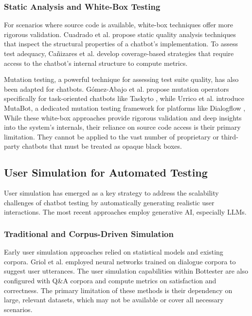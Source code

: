 \subsubsection{Static Analysis and White-Box Testing}

For scenarios where source code is available,
white-box techniques offer more rigorous validation.
Cuadrado et al. \autocite{cuadradoIntegratingStaticQuality2024}
propose static quality analysis techniques
that inspect the structural properties of a chatbot's implementation.
To assess test adequacy, Cañizares et al.
\autocite{canizaresCoveragebasedStrategiesAutomated2024}
develop coverage-based strategies that
require access to the chatbot's internal structure to compute metrics.

Mutation testing, a powerful technique for assessing test suite quality,
has also been adapted for chatbots.
Gómez-Abajo et al. \autocite{gomez-abajoMutationTestingTaskOriented2024}
propose mutation operators specifically for task-oriented chatbots like Taskyto \autocite{sanchezcuadradoAutomatingDevelopmentTaskoriented2024},
while Urrico et al. \autocite{urricoMutaBotMutationTesting2024} introduce MutaBot,
a dedicated mutation testing framework for platforms like Dialogflow \autocite{Dialogflow},
While these white-box approaches provide rigorous validation
and deep insights into the system's internals,
their reliance on source code access
is their primary limitation.
They cannot be applied to the vast number of
proprietary or third-party chatbots
that must be treated as opaque black boxes.

\subsection{User Simulation for Automated Testing}

User simulation has emerged as a key strategy to
address the scalability challenges of chatbot testing
by automatically generating realistic user interactions.
The most recent approaches employ generative \acl{AI},
especially \acp {LLM}.

\subsubsection{Traditional and Corpus-Driven Simulation}

Early user simulation approaches
relied on statistical models and existing corpora.
Griol et al. \autocite{griolAutomaticDialogSimulation2013}
employed neural networks trained on dialogue corpora
to suggest user utterances.
The user simulation capabilities within Bottester
\autocite{vasconcelosBottesterTestingConversational2017}
are also configured with Q\&A corpora
and compute metrics on satisfaction and correctness.
The primary limitation of these methods is
their dependency on large, relevant datasets,
which may not be available or cover all necessary scenarios.

